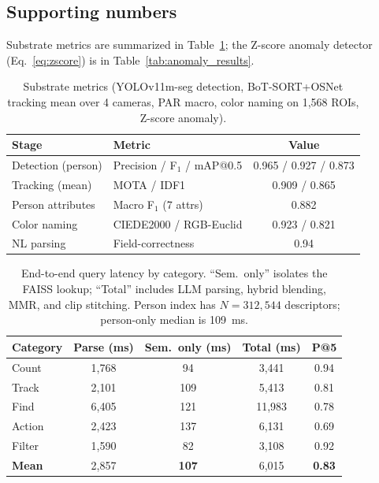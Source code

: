 ﻿\documentclass[conference]{IEEEtran}
\theoremstyle{definition}
\begin{document}
\subsection{Supporting numbers}
Substrate metrics are summarized in Table~\ref{tab:substrate}; the Z-score anomaly detector (Eq.~\eqref{eq:zscore}) is in Table~\ref{tab:anomaly_results}.
\begin{table}[!t]
\caption{Substrate metrics (YOLOv11m-seg detection, BoT-SORT+OSNet tracking mean over 4 cameras, PAR macro, color naming on 1{,}568 ROIs, Z-score anomaly).}
\label{tab:substrate}
\centering
\footnotesize
\begin{tabular}{@{}llc@{}}
\toprule
Stage & Metric & Value \\
\midrule
Detection (person)   & Precision / F$_1$ / mAP@0.5 & 0.965 / 0.927 / 0.873 \\
Tracking (mean)      & MOTA / IDF1                  & 0.909 / 0.865 \\
Person attributes    & Macro F$_1$ (7 attrs)        & 0.882 \\
Color naming         & CIEDE2000 / RGB-Euclid       & 0.923 / 0.821 \\
NL parsing           & Field-correctness            & 0.94 \\
\bottomrule
\end{tabular}
\end{table}

\begin{table}[!t]
\caption{End-to-end query latency by category. ``Sem.\ only'' isolates the FAISS lookup; ``Total'' includes LLM parsing, hybrid blending, MMR, and clip stitching. Person index has $N{=}312{,}544$ descriptors; person-only median is 109~ms.}
\label{tab:query_performance}
\centering
\scriptsize
\setlength{\tabcolsep}{3pt}
\begin{tabular*}{\columnwidth}{@{\extracolsep{\fill}}lcccc@{}}
\toprule
Category & Parse (ms) & Sem.\ only (ms) & Total (ms) & P@5 \\
\midrule
Count   & 1{,}768 & \phantom{0}94 & 3{,}441 & 0.94 \\
Track   & 2{,}101 & 109           & 5{,}413 & 0.81 \\
Find    & 6{,}405 & 121           & 11{,}983 & 0.78 \\
Action  & 2{,}423 & 137           & 6{,}131 & 0.69 \\
Filter  & 1{,}590 & \phantom{0}82 & 3{,}108 & 0.92 \\
\midrule
\textbf{Mean} & 2{,}857 & \textbf{107} & 6{,}015 & \textbf{0.83} \\
\bottomrule
\end{tabular*}
\end{table}
\end{document}
